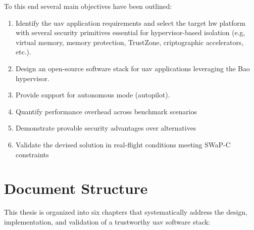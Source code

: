 To this end several main objectives have been outlined:
\begin{enumerate}
\item Identify the \gls{uav} application requirements and select the target
  \gls{hw} platform with several security primitives essential for
  hypervisor-based isolation
  (e.g, virtual memory, memory protection, TrustZone, criptographic
  accelerators, etc.).
\item Design an open-source software stack for \gls{uav} applications leveraging
  the Bao hypervisor.
\item Provide support for autonomous mode (autopilot).
\item Quantify performance overhead across benchmark scenarios
\item Demonstrate provable security advantages over alternatives
\item Validate the devised solution in real-flight conditions meeting
    SWaP-C constraints
  
\end{enumerate}

\section{Document Structure}
\label{sec:doc-structure}
This thesis is organized into six chapters that systematically address the
design, implementation, and validation of a trustworthy \gls{uav} software
stack:

